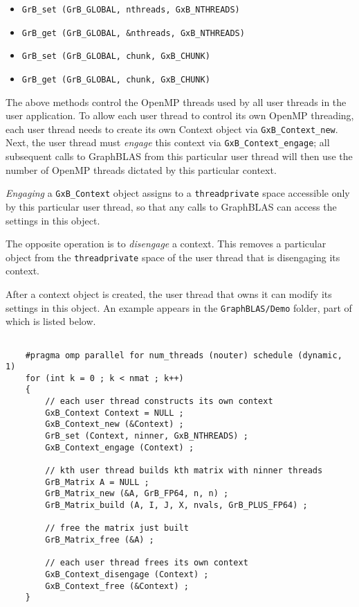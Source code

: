 \documentclass[12pt]{article}
\begin{document}
    \begin{itemize}
    \item \verb'GrB_set (GrB_GLOBAL, nthreads, GxB_NTHREADS)'
    \item \verb'GrB_get (GrB_GLOBAL, &nthreads, GxB_NTHREADS)'
    \item \verb'GrB_set (GrB_GLOBAL, chunk, GxB_CHUNK)'
    \item \verb'GrB_get (GrB_GLOBAL, chunk, GxB_CHUNK)'
    \end{itemize}

The above methods control the OpenMP threads used by all user threads in the
user application.  To allow each user thread to control its own OpenMP
threading, each user thread needs to create its own Context object via
\verb'GxB_Context_new'.  Next, the user thread must {\em engage} this context
via \verb'GxB_Context_engage'; all subsequent calls to GraphBLAS from this
particular user thread will then use the number of OpenMP threads dictated by
this particular context.

{\em Engaging} a \verb'GxB_Context' object assigns to a \verb'threadprivate'
space accessible only by this particular user thread, so that any calls to
GraphBLAS can access the settings in this object.

The opposite operation is to {\em disengage} a context.  This removes a
particular object from the \verb'threadprivate' space of the user thread
that is disengaging its context.

After a context object is created, the user thread that owns it can modify
its settings in this object.  An example appears in the \verb'GraphBLAS/Demo'
folder, part of which is listed below.

{\footnotesize
\begin{verbatim}

    #pragma omp parallel for num_threads (nouter) schedule (dynamic, 1)
    for (int k = 0 ; k < nmat ; k++)
    {
        // each user thread constructs its own context
        GxB_Context Context = NULL ;
        GxB_Context_new (&Context) ;
        GrB_set (Context, ninner, GxB_NTHREADS) ;
        GxB_Context_engage (Context) ;

        // kth user thread builds kth matrix with ninner threads
        GrB_Matrix A = NULL ;
        GrB_Matrix_new (&A, GrB_FP64, n, n) ;
        GrB_Matrix_build (A, I, J, X, nvals, GrB_PLUS_FP64) ;

        // free the matrix just built
        GrB_Matrix_free (&A) ;

        // each user thread frees its own context
        GxB_Context_disengage (Context) ;
        GxB_Context_free (&Context) ;
    }
\end{verbatim}
}
\end{document}

